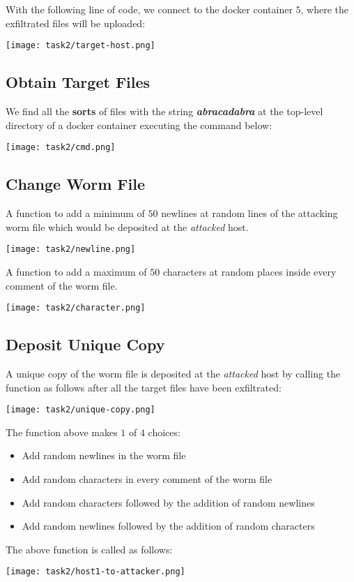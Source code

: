 \documentclass{article}
\begin{document}
With the following line of code, we connect to the docker container $5$, where the exfiltrated files will be uploaded:
\begin{center}
    \texttt{[image: task2/target-host.png]}
\end{center}


 \subsection{Obtain Target Files}
We find all the \textbf{sorts} of files with the string \textbf{\textit{abracadabra}} at the top-level directory of a docker container executing the command below:
\begin{center}
    \texttt{[image: task2/cmd.png]}
\end{center}

 \subsection{Change Worm File}
 A function to add a minimum of $50$ newlines at random lines of the attacking worm file which would be deposited at the \textit{attacked} host.
 \begin{center}
    \texttt{[image: task2/newline.png]}
\end{center}

A function to add a maximum of $50$ characters at random places inside every comment of the worm file.
\begin{center}
    \texttt{[image: task2/character.png]}
\end{center}

\subsection{Deposit Unique Copy}
A unique copy of the worm file is deposited at the \textit{attacked} host by calling the function as follows after all the target files have been exfiltrated:
\begin{center}
    \texttt{[image: task2/unique-copy.png]}
\end{center}

The function above makes $1$ of $4$ choices:
\begin{itemize}
    \item Add random newlines in the worm file
    \item Add random characters in every comment of the worm file
    \item Add random characters followed by the addition of random newlines
    \item Add random newlines followed by the addition of random characters
\end{itemize}

The above function is called as follows:
\begin{center}
    \texttt{[image: task2/host1-to-attacker.png]}
\end{center}
\end{document}
